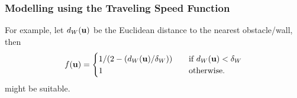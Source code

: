 \documentclass[aspectratio=169,handout]{beamer}
\begin{document}
\begin{frame}
	\frametitle{Modelling using the Traveling Speed Function}
	For example, let $d_W(\mathbf{u})$ be the Euclidean distance to the nearest obstacle/wall, then
	\begin{equation*}
		f(\mathbf{u}) = \begin{cases}
			1 / (2-(d_W(\mathbf{u})/ \delta_{W})) & \quad \text{if } d_W(\mathbf{u}) < \delta_{W} \\
			1  & \quad \text{otherwise}.
		\end{cases}
	\end{equation*}
	might be suitable.
	\begin{figure}
		\hfill
		\hfill
	\end{figure}
\end{frame}
\end{document}
